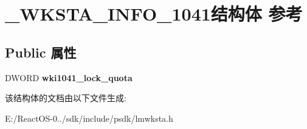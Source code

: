 \hypertarget{struct___w_k_s_t_a___i_n_f_o__1041}{}\section{\+\_\+\+W\+K\+S\+T\+A\+\_\+\+I\+N\+F\+O\+\_\+1041结构体 参考}
\label{struct___w_k_s_t_a___i_n_f_o__1041}
\subsection*{Public 属性}
\begin{DoxyCompactItemize}
\item 
\mbox{\label{struct___w_k_s_t_a___i_n_f_o__1041_af383d48394fedfa0c505b0cd3601d0a3}} 
D\+W\+O\+RD {\bfseries wki1041\+\_\+lock\+\_\+quota}
\end{DoxyCompactItemize}


该结构体的文档由以下文件生成\+:\begin{DoxyCompactItemize}
\item 
E\+:/\+React\+O\+S-\/0../sdk/include/psdk/lmwksta.\+h\end{DoxyCompactItemize}
